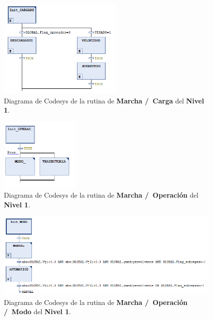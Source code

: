 \documentclass[11pt]{article}
\begin{document}
\begin{figure}[!h]
	\centering
	\includegraphics[width=0.55\textwidth]{images/imagen_31_codesys_nivel_1_marcha_carga.png}
	\caption{Diagrama de Codesys de la rutina de \textbf{Marcha /\ Carga} del \textbf{Nivel 1}.}
	\label{fig:codesys_nivel_1_marcha_carga}
\end{figure}

\begin{figure}[!h]
	\centering
	\includegraphics[width=0.35\textwidth]{images/imagen_32_codesys_nivel_1_marcha_operacion.png}
	\caption{Diagrama de Codesys de la rutina de \textbf{Marcha /\ Operación} del \textbf{Nivel 1}.}
	\label{fig:codesys_nivel_1_marcha_operacion}
\end{figure}

\begin{figure}[!h]
	\centering
	\includegraphics[width=1\textwidth]{images/imagen_33_codesys_nivel_1_marcha_operacion_modo.png}
	\caption{Diagrama de Codesys de la rutina de \textbf{Marcha /\ Operación /\ Modo} del \textbf{Nivel 1}.}
	\label{fig:codesys_nivel_1_marcha_operacion_modo}
\end{figure}
\end{document}
